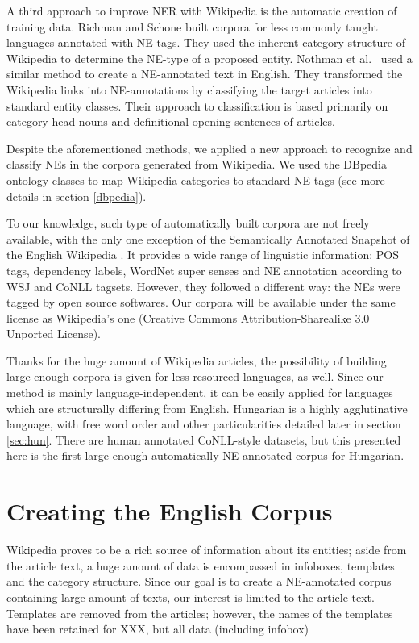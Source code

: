 \documentclass[11pt]{article}
\begin{document}
A third approach to improve NER with Wikipedia is the automatic creation of training data. Richman and Schone  built corpora for less commonly taught languages annotated with NE-tags. They used the inherent category structure of Wikipedia to determine the NE-type of a proposed entity. Nothman et al.~ used a similar method to create a NE-annotated text in English. They transformed the Wikipedia links into NE-annotations by classifying the target articles into standard entity classes. Their approach to classification is based primarily on category head nouns and definitional opening sentences of articles. 

Despite the aforementioned methods, we applied a new approach to recognize and classify NEs in the corpora generated from Wikipedia. We used the DBpedia ontology classes to map Wikipedia categories to standard NE tags (see more details in section \ref{dbpedia}). 

To our knowledge, such type of automatically built corpora are not freely available, with the only one exception of the Semantically Annotated Snapshot of the English Wikipedia \cite{Zaragoza:07}. It provides a wide range of linguistic information: POS tags, dependency labels, WordNet super senses and NE annotation according to WSJ and CoNLL tagsets. However, they followed a different way: the NEs were tagged by open source softwares. Our corpora will be available under the same license as Wikipedia's one (Creative Commons Attribution-Sharealike 3.0 Unported License).

Thanks for the huge amount of Wikipedia articles, the possibility of building large enough corpora is given for less resourced languages, as well. Since our method is mainly language-independent, it can be easily applied for languages which are structurally differing from English. Hungarian is a highly agglutinative language, with free word order and other particularities detailed later in section \ref{sec:hun}. There are human annotated CoNLL-style datasets, but this presented here is the first large enough automatically NE-annotated corpus for Hungarian. 

\section{Creating the English Corpus}  %
\label{sec:create}


Wikipedia proves to be a rich source of information about its entities; aside from the article text, a huge amount of data is encompassed in infoboxes, templates and the category structure. Since our goal is to create a NE-annotated corpus containing large amount of texts, our interest is limited to the article text. Templates are removed from the articles; however, the names of the templates have been retained for XXX, but all data (including infobox) 
\end{document}
